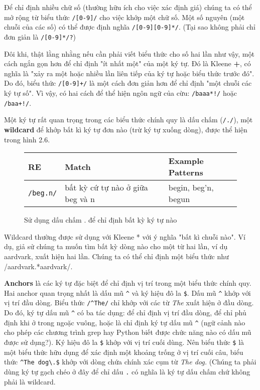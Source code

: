 Để chỉ định nhiều chữ số (thường hữu ích cho việc xác định giá) chúng ta có thể mở rộng từ biểu thức \verb|/[0-9]/| cho việc khớp một chữ số. Một số nguyên (một chuỗi của các số) có thể được định nghĩa \verb|/[0-9][0-9]*/|. (Tại sao không phải chỉ đơn giản là \verb|/[0-9]*/?|)

Đôi khi, thật lằng nhằng nếu cần phải viết biểu thức cho số hai lần như vậy, một cách ngắn gọn hơn để chỉ định "ít nhất một" của một ký tự. Đó là Kleene \textbf{+}, có nghĩa là "xảy ra một hoặc nhiều lần liên tiếp của ký tự hoặc biểu thức trước đó". Do đó, biểu thức \verb|/[0-9]+/| là một cách đơn giản hơn để chỉ định "một chuỗi các ký tự số". Vì vậy, có hai cách để thể hiện ngôn ngữ của cừu: \verb|/baaa*!/| hoặc \verb|/baa+!/|.

Một ký tự rất quan trọng trong các biểu thức chính quy là dấu chấm (\verb|/./|), một \textbf{wildcard} để khớp bất kì ký tự đơn nào (trừ ký tự xuống dòng), được thể hiện trong hình 2.6.

\begin{figure}[h]
	\begin{tabular}{ l l l }
	 \hline
	 RE & Match & Example Patterns \\
	 \hline
	 \verb|/beg.n/| & bất kỳ cứ tự nào ở giữa beg và n & begin, beg'n, begun \\
	 \hline
	\end{tabular}
 \caption{Sử dụng dấu chấm . để chỉ định bất kỳ ký tự nào}
 \label{table:2.6}
\end{figure}

Wildcard thường được sử dụng với Kleene * với ý nghĩa "bất kì chuỗi nào". Ví dụ, giả sử chúng ta muốn tìm bất kỳ dòng nào cho một từ hai lần, ví dụ aardvark, xuất hiện hai lần. Chúng ta có thể chỉ định một biểu thức như /aardvark.*aardvark/.

\textbf{Anchors} là các ký tự đặc biệt để chỉ định vị trí trong một biểu thức chính quy. Hai anchor quan trọng nhất là dấu mũ \verb|^| và ký hiệu đô la \verb|$|. Dấu mũ \verb|^| khớp với vị trí đầu dòng. Biểu thức \verb|/^The/| chỉ khớp với các từ \textit{The} xuất hiện ở đầu dòng. Do đó, ký tự dấu mũ \verb|^| có ba tác dụng: để chỉ định vị trí đầu dòng, để chỉ phủ định khi ở trong ngoặc vuông, hoặc là chỉ định ký tự dấu mũ \verb|^| (ngữ cảnh nào cho phép các chương trình grep hay Python biết được chức năng nào có dấu mũ được sử dụng?). Ký hiệu đô la \verb|$| khớp với vị trí cuối dùng. Nên biểu thức \textvisiblespace \verb|$| là một biểu thức hữu dụng để xác định một khoảng trống ở vị trí cuối câu, biểu thức \verb|^The dog\.$| khớp với dòng chứa chính xác cụm từ \textit{The dog.} (Chúng ta phải dùng ký tự gạch chéo ở đây để chỉ dấu \verb|.| có nghĩa là ký tự dấu chấm chứ không phải là wildcard.

